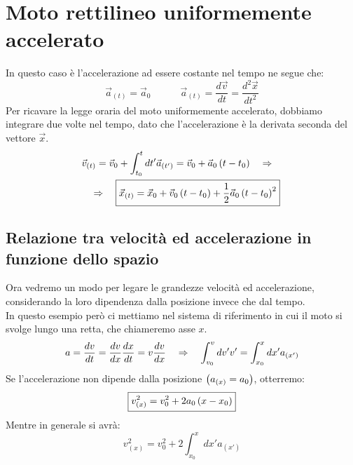 \section{Moto rettilineo uniformemente accelerato}
In questo caso è l'accelerazione ad essere costante nel tempo
ne segue che:
\begin{equation}
    \vec a_{(t)} = \vec a_0 \quad\quad\quad \vec a_{(t)} = \frac{d\vec v}{dt} = 
    \frac{d^2\vec x}{dt^2}
\label{eq:acceleration}
\end{equation}
Per ricavare la legge oraria del moto uniformemente accelerato,
dobbiamo integrare due volte nel tempo, dato che l'accelerazione
è la derivata seconda del vettore $\vec x$.
\begin{multline}
    \vec v_{(t)} = \vec v_0 + \int_{t_0}^{t}dt' \vec a_{(t')} =  \vec v_0 +  \vec a_0\left( t - t_0\right)\quad\Rightarrow\quad
    \\\quad\Rightarrow\quad\boxed{\vec x_{(t)} = \vec x_0 +\vec v_0\left( t - t_0\right) + \frac12\vec a_0\left( t-t_0\right)^2}
\label{eq:MRUA}
\end{multline}

\subsection{Relazione tra velocità ed accelerazione in funzione dello spazio}
Ora vedremo un modo per legare le grandezze velocità ed 
accelerazione, considerando la loro dipendenza dalla posizione
invece che dal tempo.\\
In questo esempio però ci mettiamo nel sistema di riferimento 
in cui il moto si svolge lungo una retta, che chiameremo asse $x$.
\begin{equation}
    a = \frac{dv}{dt} = \frac{dv}{dx}\frac{dx}{dt} =
    v\frac{dv}{dx}\quad\Rightarrow\quad \int_{v_0}^{v}dv'v' = \int_{x_0}^{x}dx'a_{(x')}
\end{equation}
Se l'accelerazione non dipende dalla posizione $\left( a_{(x)} = a_0\right)$, otterremo:
\begin{equation}
    \boxed{v^2_{(x)} = v_0^2 + 2a_0\left( x-x_0\right)}
\label{eq:v(x)_0}
\end{equation}
Mentre in generale si avrà:
\begin{equation}
    \boxed{\boxed{v^2_{(x)} = v_0^2 + 2\int_{x_0}^x dx'a_{(x')}}}
\label{eq:v(x)_gen}
\end{equation}

